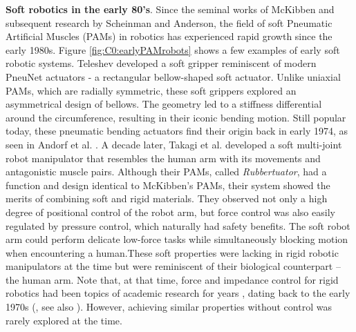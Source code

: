 \vspace{2mm}
\textbf{Soft robotics in the early 80's}. Since the seminal works of McKibben and subsequent research by Scheinman and Anderson, the field of soft Pneumatic Artificial Muscles (PAMs) in robotics has experienced rapid growth since the early 1980s. Figure \ref{fig:C0:earlyPAMrobots} shows a few examples of early soft robotic systems. Teleshev \cite{Teleshev1981} developed a soft gripper reminiscent of modern PneuNet actuators \cite{Galloway2016, Mosadegh2014, Choi2011} - a rectangular bellow-shaped soft actuator. Unlike uniaxial PAMs, which are radially symmetric, these soft grippers explored an asymmetrical design of bellows. The geometry led to a stiffness differential around the circumference, resulting in their iconic bending motion. Still popular today, these pneumatic bending actuators find their origin back in early 1974, as seen in Andorf et al. \cite{Andorf1974}. A decade later, Takagi et al. \cite{Takagi1983} developed a soft multi-joint robot manipulator that resembles the human arm with its movements and antagonistic muscle pairs. Although their PAMs, called \textit{Rubbertuator}, had a function and design identical to McKibben's PAMs, their system showed the merits of combining soft and rigid materials. They observed not only a high degree of positional control of the robot arm, but force control was also easily regulated by pressure control, which naturally had safety benefits. The soft robot arm could perform delicate low-force tasks while simultaneously blocking motion when encountering a human.These soft properties were lacking in rigid robotic manipulators at the time but were reminiscent of their biological counterpart -- the human arm. Note that, at that time, force and impedance control for rigid robotics had been topics of academic research for years \cite{Anderson1988, Khatib1987, Hogan1984, Hogan1984Jan}, dating back to the early 1970s (\eg, see also \cite{Markiewicz1973}). However, achieving similar properties without control was rarely explored at the time.
%
